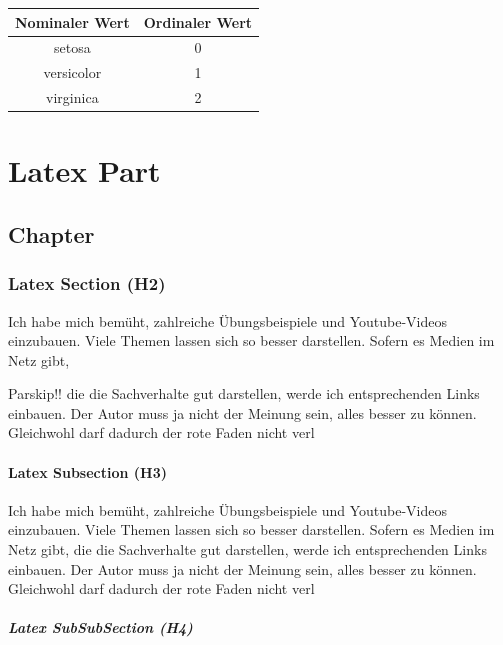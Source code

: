 \documentclass[
  oneside]{book}
\begin{document}
\begin{longtable}[]{@{}cc@{}}
\toprule
Nominaler Wert & Ordinaler Wert \\
\midrule
\endhead
setosa & 0 \\
versicolor & 1 \\
virginica & 2 \\
\bottomrule
\end{longtable}

\hypertarget{part-latex-part}{%
\part*{Latex Part}\label{part-latex-part}}

\hypertarget{chapter}{%
\chapter{Chapter}\label{chapter}}

\hypertarget{latex-section-h2}{%
\section{Latex Section (H2)}\label{latex-section-h2}}

Ich habe mich bemüht, zahlreiche Übungsbeispiele und Youtube-Videos einzubauen. Viele Themen lassen sich so besser darstellen. Sofern es Medien im Netz gibt,

Parskip!! die die Sachverhalte gut darstellen, werde ich entsprechenden Links einbauen. Der Autor muss ja nicht der Meinung sein, alles besser zu können. Gleichwohl darf dadurch der rote Faden nicht verl

\hypertarget{latex-subsection-h3}{%
\subsection{Latex Subsection (H3)}\label{latex-subsection-h3}}

Ich habe mich bemüht, zahlreiche Übungsbeispiele und Youtube-Videos einzubauen. Viele Themen lassen sich so besser darstellen. Sofern es Medien im Netz gibt, die die Sachverhalte gut darstellen, werde ich entsprechenden Links einbauen. Der Autor muss ja nicht der Meinung sein, alles besser zu können. Gleichwohl darf dadurch der rote Faden nicht verl

\hypertarget{latex-subsubsection-h4}{%
\subsubsection{Latex SubSubSection (H4)}\label{latex-subsubsection-h4}}
\end{document}
